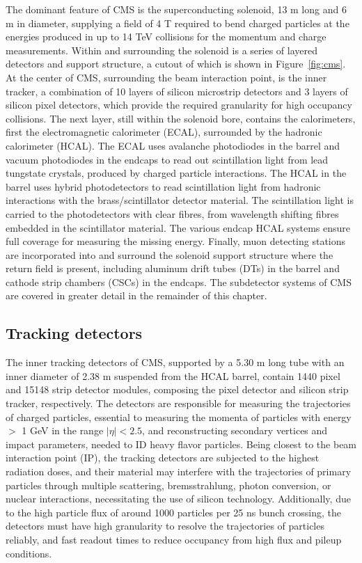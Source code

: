 \indent The dominant feature of CMS is the superconducting solenoid, 13 m long and 6 m in diameter, supplying a field of 4 T required to bend charged particles at the energies produced in up to 14 TeV collisions for the momentum and charge measurements. Within and surrounding the solenoid is a series of layered detectors and support structure, a cutout of which is shown in Figure~\ref{fig:cms}. At the center of CMS, surrounding the beam interaction point, is the inner tracker, a combination of 10 layers of silicon microstrip detectors and 3 layers of silicon pixel detectors, which provide the required granularity for high occupancy collisions. The next layer, still within the solenoid bore, contains the calorimeters, first the electromagnetic calorimeter (ECAL), surrounded by the hadronic calorimeter (HCAL). The ECAL uses avalanche photodiodes in the barrel and vacuum photodiodes in the endcaps to read out scintillation light from lead tungstate crystals, produced by charged particle interactions. The HCAL in the barrel uses hybrid photodetectors to read scintillation light from hadronic interactions with the brass/scintillator detector material. The scintillation light is carried to the photodetectors with clear fibres, from wavelength shifting fibres embedded in the scintillator material. The various endcap HCAL systems ensure full coverage for measuring the missing energy. Finally, muon detecting stations are incorporated into and surround the solenoid support structure where the return field is present, including aluminum drift tubes (DTs) in the barrel and cathode strip chambers (CSCs) in the endcaps. The subdetector systems of CMS are covered in greater detail in the remainder of this chapter. 

\subsection{Tracking detectors}

The inner tracking detectors of CMS, supported by a 5.30 m long tube with an inner diameter of 2.38 m suspended from the HCAL barrel, contain 1440 pixel and 15148 strip detector modules, composing the pixel detector and silicon strip tracker, respectively. The detectors are responsible for measuring the trajectories of charged particles, essential to measuring the momenta of particles with energy $>$ 1 GeV in the range $|\eta|<2.5$, and reconstructing secondary vertices and impact parameters, needed to ID heavy flavor particles. Being closest to the beam interaction point (IP), the tracking detectors are subjected to the highest radiation doses, and their material may interfere with the trajectories of primary particles through multiple scattering, bremsstrahlung, photon conversion, or nuclear interactions, necessitating the use of silicon technology. Additionally, due to the high particle flux of around 1000 particles per 25 ns bunch crossing, the detectors must have high granularity to resolve the trajectories of particles reliably, and fast readout times to reduce occupancy from high flux and pileup conditions. 

